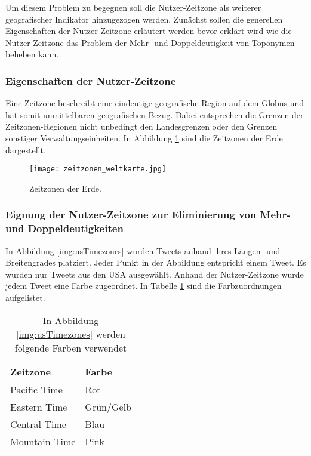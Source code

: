 				Um diesem Problem zu begegnen soll die Nutzer-Zeitzone als weiterer geografischer Indikator hinzugezogen werden.
				Zunächst sollen die generellen Eigenschaften der Nutzer-Zeitzone erläutert werden bevor erklärt wird wie die Nutzer-Zeitzone das Problem der Mehr- und Doppeldeutigkeit von Toponymen beheben kann.

				\subsubsection{Eigenschaften der Nutzer-Zeitzone}

					Eine Zeitzone beschreibt eine eindeutige geografische Region auf dem Globus und hat somit unmittelbaren geografischen Bezug.
					Dabei entsprechen die Grenzen der Zeitzonen-Regionen nicht unbedingt den Landesgrenzen oder den Grenzen sonstiger Verwaltungseinheiten. 
					In Abbildung \ref{img:timezones} sind die Zeitzonen der Erde dargestellt.

					\begin{figure}[!ht]
						\begin{center}
							\texttt{[image: zeitzonen\_weltkarte.jpg]}
							\caption{Zeitzonen der Erde.}
							\label{img:timezones}
						\end{center}
					\end{figure}	

				\subsubsection{Eignung der Nutzer-Zeitzone zur Eliminierung von Mehr- und Doppeldeutigkeiten}

					In Abbildung \ref{img:usTimezones} wurden Tweets anhand ihres Längen- und Breitengrades platziert.
					Jeder Punkt in der Abbildung entspricht einem Tweet.
					Es wurden nur Tweets aus den USA ausgewählt.
					Anhand der Nutzer-Zeitzone wurde jedem Tweet eine Farbe zugeordnet.
					In Tabelle \ref{tab:timezoneColors} sind die Farbzuordnungen aufgelistet. 

					\begin{table}[h]
					\centering
					\caption{In Abbildung \ref{img:usTimezones} werden folgende Farben verwendet}
					\label{tab:timezoneColors}
						\begin{tabular}{|l|l|}
							\hline
							Zeitzone      & Farbe     \\ \hline \hline
							Pacific Time  & Rot       \\ \hline
							Eastern Time  & Grün/Gelb \\ \hline
							Central Time  & Blau      \\ \hline
							Mountain Time & Pink      \\ \hline
						\end{tabular}
					\end{table}

